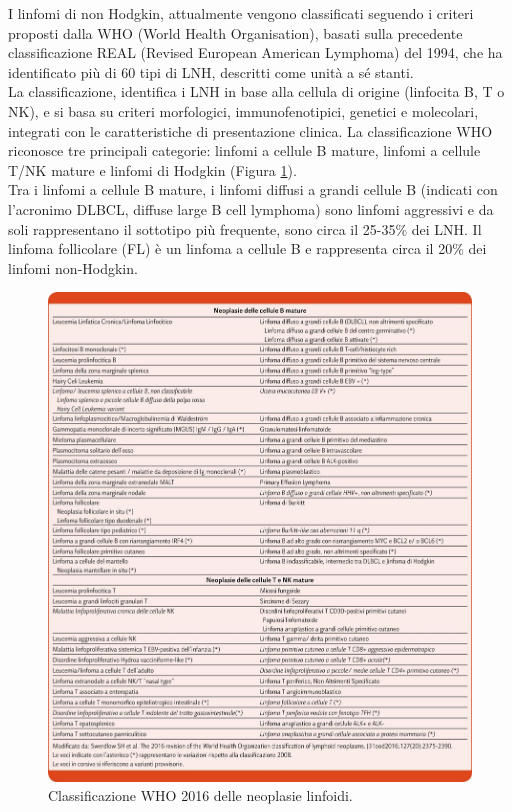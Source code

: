 I linfomi di non Hodgkin, attualmente vengono classificati seguendo i criteri proposti dalla WHO 
(World Health Organisation), basati sulla precedente classificazione REAL (Revised European American Lymphoma) 
del 1994, che ha identificato più di 60 tipi di LNH, descritti come unità a sé stanti\cite{AIOM}.\\
La classificazione, identifica i LNH in base alla cellula di origine 
(linfocita B, T o NK), e si basa su criteri morfologici, immunofenotipici, genetici e molecolari, 
integrati con le caratteristiche di presentazione clinica\cite{AIOM}. 
La classificazione WHO riconosce tre principali categorie: linfomi a cellule B mature, linfomi a cellule T/NK
mature e linfomi di Hodgkin (Figura \ref{fig:FIGURE_2.13}).\\
Tra i linfomi a cellule B mature, i linfomi diffusi a grandi cellule B (indicati con l’acronimo DLBCL, 
diffuse large B cell lymphoma) sono linfomi aggressivi e da soli rappresentano il sottotipo più frequente, 
sono circa il 25-35\% dei LNH\cite{AIOM}.
Il linfoma follicolare (FL) è un linfoma a cellule B e rappresenta circa il 20\% dei linfomi non-Hodgkin.

\begin{figure}[H]
    \begin{center}
    \includegraphics[width=1.0\columnwidth]{img/CLASS.WHO.jpeg}
    \vspace{-3mm}
    \end{center}
    \caption{Classificazione WHO 2016 delle neoplasie linfoidi.
    \cite{img15-18}}
    \label{fig:FIGURE_2.13}
\end{figure}

